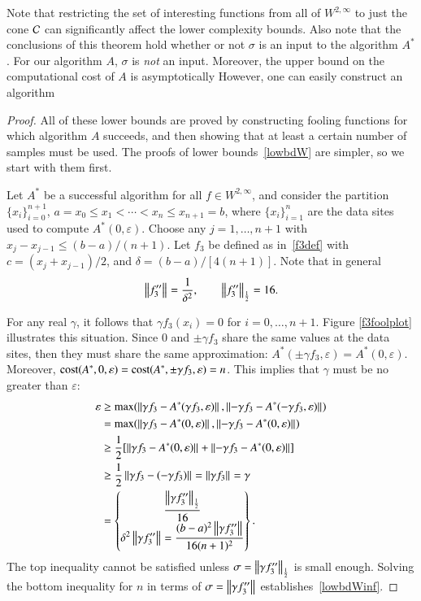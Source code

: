 \documentclass[review]{elsarticle}
\newcommand{\abstol}{\varepsilon}
\theoremstyle{definition}
\renewcommand{\cw}{W}
\begin{document}
Note that restricting the set of interesting functions from all of $ \cw^{2,\infty}$ to just the cone $\cc$ can significantly affect the lower complexity bounds.  Also note that the conclusions of this theorem hold whether or not $\sigma$ is an input to the algorithm $A^*$.  For our algorithm $A$, $\sigma$ is \emph{not} an input. Moreover, the upper bound on the computational cost of $A$ is asymptotically  However, one can easily construct an algorithm

\begin{proof}
	All of these lower bounds are proved by constructing fooling functions for which algorithm $A$ succeeds, and then showing that at least a certain number of samples must be used.  The proofs of lower bounds~\eqref{lowbdW} are simpler, so we start with them first.
	
	Let $A^*$ be a successful algorithm for all $f \in  \cw^{2,\infty}$, and consider the partition $\{x_i\}_{i=0}^{n+1}$, $a=x_0 \le x_1 < \cdots < x_n \le x_{n+1} = b$, where $\{x_i\}_{i=1}^n$ are the data sites used to compute  $A^*(0,\abstol)$.  Choose any $j=1, \ldots, n+1$ with $x_j-x_{j-1} \le (b-a)/(n+1)$.  Let $f_3$ be defined as in~\eqref{f3def} with $c = (x_j+x_{j-1})/2$, and $\delta  = (b-a)/[4(n+1)]$.  Note that in general
	\begin{equation}
	\norm{f_3''} = \frac{1}{\delta^{2}}, \qquad \norm[\frac 12]{f_3''} = 16.
	\end{equation}

For any real $\gamma$, it follows that $\gamma f_3(x_i)=0$ for $i=0, \ldots, n+1$.  Figure \ref{f3foolplot} illustrates this situation.  Since $0$ and $\pm \gamma f_3$ share the same values at the data sites, then they must share the same approximation: $A^*(\pm \gamma f_3,\abstol) = A^*(0,\abstol)$.  Moreover, $\cost(A^*,0,\abstol) = \cost(A^*,\pm \gamma f_3,\abstol) = n$.  This implies  that $\gamma$ must be no greater than $\abstol$:
	\begin{align*}
	\abstol  &\ge \max(\norm{\gamma f_3 - A^*(\gamma f_3,\abstol)}, \norm{-\gamma f_3 - A^*(-\gamma f_3,\abstol)}) \\
	&= \max(\norm{\gamma f_3 - A^*(0,\abstol)}, \norm{-\gamma f_3 - A^*(0,\abstol)}) \\
	& \ge \frac{1}{2} [\norm{\gamma f_3 - A^*(0,\abstol)} + \norm{-\gamma f_3 - A^*(0,\abstol)}] \\
	& \ge \frac{1}{2} \norm{\gamma f_3 - (-\gamma f_3)} =  \norm{\gamma f_3} = \gamma \\
	& = \begin{Bmatrix} \displaystyle \frac{ \norm[\frac 12]{\gamma f_3''}}{16}  \\
	\displaystyle \delta^2 	\norm{\gamma f_3''} =  \frac{(b-a)^2 \norm{\gamma f_3''}}{16(n+1)^2}
	\end{Bmatrix}.
	\end{align*}
The top inequality cannot be satisfied unless $\sigma = \norm[\frac 12]{\gamma f_3''}$ is small enough.  Solving the bottom inequality for $n$ in terms of $\sigma =  \norm{\gamma f_3''}$ establishes~\eqref{lowbdWinf}.
	

\end{proof}
\end{document}
